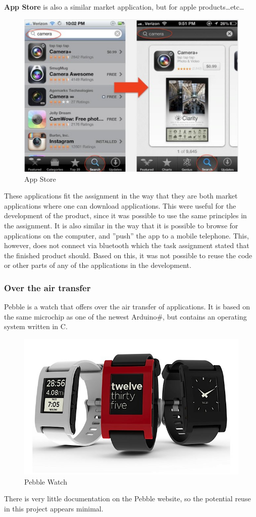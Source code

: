 {\bf App Store} is also a similar market application, but for apple products\ldots etc\ldots\\
\begin{figure}[H]
\includegraphics[scale=0.7]{images/png;base642dee0c596030bc1e.png}
\caption{App Store}
\end{figure}
These applications fit the assignment in the way that they are both market applications where one can download applications. This were useful for the development of the product, since it was possible to use the same principles in the assignment. It is also similar in the way that it is possible to browse for applications on the computer, and ''push'' the app to a mobile telephone. This, however, does not connect via bluetooth which the task assignment stated that the finished product should. Based on this, it was not possible to reuse the code or other parts of any of the applications in the development. 

\subsubsection{Over the air transfer}
Pebble is a watch that offers over the air transfer of applications. It is based on the same microchip as one of the newest Arduino\#, but contains an operating system written in C.
\begin{figure}[H]
\includegraphics[scale=0.7]{images/Pebble-Smartphone-Watch.jpeg}
\caption{Pebble Watch}
\end{figure}
There is very little documentation on the Pebble website, so the potential reuse in this project appears minimal.